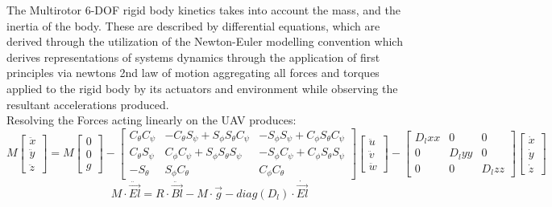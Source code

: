 \documentclass[12pt,a4paper,twoside]{report}
\begin{document}
				The Multirotor 6-DOF rigid body kinetics takes into account the mass, and the inertia of the body. These are described by differential equations, which are derived through the utilization of the Newton-Euler modelling convention which derives representations of systems dynamics through the application of first principles via newtons 2nd law of motion aggregating all forces and torques applied to the rigid body by its actuators and environment while observing the resultant accelerations produced.
				\\
				Resolving the Forces acting linearly on the UAV produces:
				\\
				\begin{equation}
					M 
					\begin{bmatrix}
						\ddot{x} \\
						\ddot{y} \\
						\ddot{z}
					\end{bmatrix}
					=
					M 
					\begin{bmatrix}
						0 \\
						0 \\
						g
					\end{bmatrix}
					-
					\begin{bmatrix}
						C_\theta C_\psi & -C_\theta S_\psi + S_\phi S_\theta C_\psi & -S_\phi S_\psi + C_\phi S_\theta C_\psi \\
						C_\theta S_\psi &  C_\phi C_\psi + S_\phi S_\theta S_\psi   & -S_\phi C_\psi + C_\phi S_\theta S_\psi \\
						-S_\theta       &  S_\phi C_\theta                          &  C_\phi C_\theta
					\end{bmatrix}
					\begin{bmatrix}
						\ddot{u} \\
						\ddot{v} \\
						\ddot{w} 
					\end{bmatrix}
					-
					\begin{bmatrix}
						D_lxx & 0 & 0 \\
						0 & D_lyy & 0 \\
						0 & 0 & D_lzz
					\end{bmatrix}
					\begin{bmatrix}
						\dot{x} \\
						\dot{y} \\
						\dot{z} 
					\end{bmatrix}
				\end{equation}  
				\[ M \cdot \ddot{\vec{El}} = R \cdot \ddot{\vec{Bl}} - M \cdot \vec{g} - diag(D_l) \cdot \dot{\vec{El}}\] 
\end{document}
